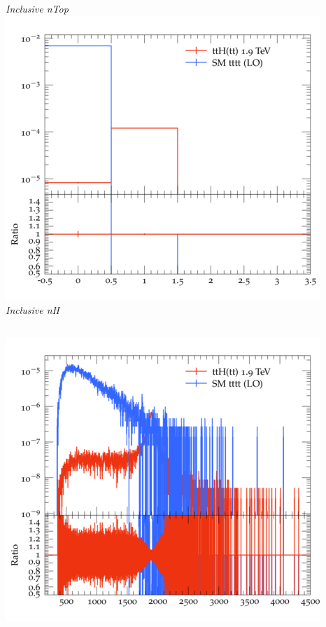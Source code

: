 \documentclass{beamer}
\begin{document}
\begin{frame}
\begin{columns}
\textit{\small Inclusive nTop}
\includegraphics[width=\textwidth]{../plots/ttH_1900/tttt_ttH/Inclusive_nH.png}\\
\textit{\small Inclusive nH}
\end{columns}
\begin{columns}
\includegraphics[width=\textwidth]{../plots/ttH_1900/tttt_ttH/Inclusive_InvM_ttbar12.png}\\

\end{columns}
\end{frame}
\end{document}
